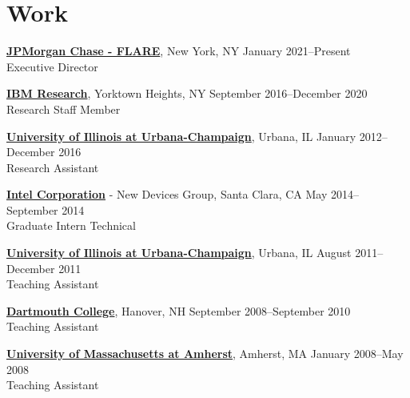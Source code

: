 
\section{\sc Work}
{\href{https://www.jpmorgan.com/insights/technology/flare}{\bf JPMorgan Chase - FLARE}}, New York, NY \hfill January 2021--Present\\
Executive Director
\vspace{-0.16cm}

{\href{http://research.ibm.com/labs/watson/index.shtml}{\bf IBM Research}}, Yorktown Heights, NY \hfill September 2016--December 2020\\
Research Staff Member
\vspace{-0.16cm}

{\href{http://www.illinois.edu/}{{\bf University of Illinois at Urbana-Champaign}}}, Urbana, IL \hfill January 2012--December 2016\\
Research Assistant
\vspace{-0.16cm}

{\href{http://www.intel.com/}{{\bf Intel Corporation}}} - New Devices Group, Santa Clara, CA \hfill May 2014--September 2014\\
Graduate Intern Technical
\vspace{-0.16cm}

{\href{http://www.illinois.edu/}{{\bf University of Illinois at Urbana-Champaign}}}, Urbana, IL \hfill August 2011--December 2011\\
Teaching Assistant
\vspace{-0.16cm}

{\href{http://www.dartmouth.edu/}{{\bf Dartmouth College}}}, Hanover, NH \hfill September 2008--September 2010\\
Teaching Assistant
\vspace{-0.16cm}

{\href{http://www.umass.edu/}{{\bf University of Massachusetts at Amherst}}}, Amherst, MA \hfill January 2008--May 2008\\
Teaching Assistant
